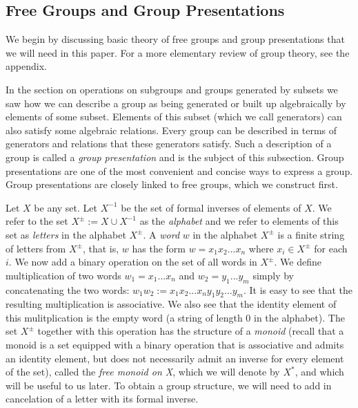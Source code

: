 \documentclass[12pt]{article}
\newcommand{\vs}{\vskip10pt}
\begin{document}
	\subsection{Free Groups and Group Presentations}
	
	\vs 
	
	We begin by discussing basic theory of free groups and group presentations that we will need in this paper. For a more elementary review of group theory, see the appendix. 
	
	\vs
	
	In the section on operations on subgroups and groups generated by subsets we saw how we can describe a group as being generated or built up algebraically by elements of some subset. Elements of this subset (which we call generators) can also satisfy some algebraic relations. Every group can be described in terms of generators and relations that these generators satisfy. Such a description of a group is called a \textit{group presentation} and is the subject of this subsection. Group presentations are one of the most convenient and concise ways to express a group. Group presentations are closely linked to free groups, which we construct first. 
	
	\vs 
	
	Let $X$ be any set. Let $X^{-1}$ be the set of formal inverses of elements of $X$. We refer to the set $X^{\pm} := X \cup X^{-1}$ as the \textit{alphabet} and we refer to elements of this set as \textit{letters} in the alphabet $X^{\pm}$. A \textit{word} $w$ in the alphabet $X^{\pm}$ is a finite string of letters from $X^{\pm}$, that is, $w$ has the form $w = x_1 x_2 ... x_n$ where $x_i \in X^{\pm}$ for each $i$. We now add a binary operation on the set of all words in $X^{\pm}$. We define multiplication of two words $w_1 = x_1 ... x_n$ and $w_2 = y_1 ... y_m$ simply by concatenating the two words: $w_1 w_2 := x_1 x_2  ... x_n y_1 y_2 ... y_m$. It is easy to see that the resulting multiplication is associative. We also see that the identity element of this mulitplication is the empty word (a string of length 0 in the alphabet). The set $X^{\pm}$ together with this operation has the structure of a \textit{monoid} (recall that a monoid is a set equipped with a binary operation that is associative and admits an identity element, but does not necessarily admit an inverse for every element of the set), called the \textit{free monoid on X}, which we will denote by $X^*$, and which will be useful to us later. To obtain a group structure, we will need to add in cancelation of a letter with its formal inverse. 
	
\end{document}
